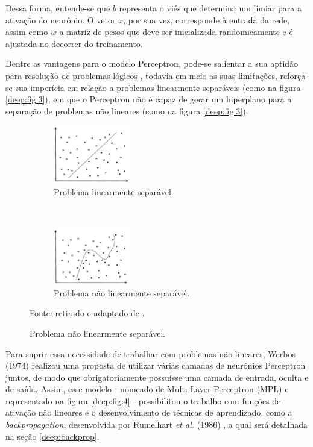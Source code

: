Dessa forma, entende-se que $b$ representa o viés que determina um limiar para a ativação do neurônio. O vetor $x$, por sua vez, corresponde à entrada da rede, assim como $w$ a matriz de pesos que deve ser inicializada randomicamente e é ajustada no decorrer do treinamento.

Dentre as vantagens para o modelo Perceptron, pode-se salientar a sua aptidão para resolução de problemas lógicos , todavia em meio as suas limitações, reforça-se sua imperícia em relação a problemas linearmente separáveis (como na figura \ref{deep:fig:3}), em que o Perceptron não é capaz de gerar um hiperplano para a separação de problemas não lineares (como na figura \ref{deep:fig:3}).

\begin{figure}[H]
   \caption{Representação de problemas linearmente e não linearmente separáveis.}
   \centering
   \label{deep:fig:3}
    \begin{subfigure}[t]{0.45\textwidth}
        \centering
        \includegraphics[height=1in]{recursos/imagens/deep/l_separavel.png}
        \caption{Problema linearmente separável.}
        \label{deep:fig:3.1}
    \end{subfigure}%
    ~ 
    \begin{subfigure}[t]{0.45\textwidth}
        \centering
        \includegraphics[height=1in]{recursos/imagens/deep/nl_separavel.png}
        \caption{Problema não linearmente separável.}
        \label{deep:fig:3.2}
    \end{subfigure}%

    \vspace*{1 cm}
    Fonte: retirado e adaptado de \cite{GoncalvesMaquinaSuporte}.
\end{figure}

Para suprir essa necessidade de trabalhar com problemas não lineares, Werbos (1974) \cite{Werbos:74} realizou uma proposta de utilizar várias camadas de neurônios Perceptron juntos, de modo que obrigatoriamente possuísse uma camada de entrada, oculta e de saída. Assim, esse modelo - nomeado de Multi Layer Perceptron (MPL) \cite{Werbos:74} e representado na figura \ref{deep:fig:4} - possibilitou o trabalho com funções de ativação não lineares e o desenvolvimento de técnicas de aprendizado, como a \textit{backpropagation}, desenvolvida por Rumelhart \textit{et al.} (1986) \cite{rumelhart1986learning}, a qual será detalhada na seção \ref{deep:backprop}.

